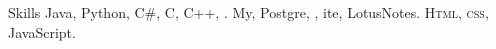 
\begin{rubric}{Skills}
	Java, Python, C\#, C, C++, .
\entry*[Databases]
	My, Postgre, , ite, LotusNotes.
	\textsc{Html, css}, JavaScript.
\end{rubric}
